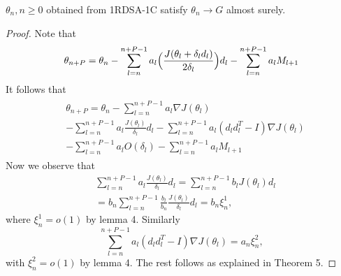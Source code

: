 \begin{theorem}
  $\theta_n, n\geq0$ obtained from 1RDSA-1C satisfy $\theta_n \rightarrow G$
 almost surely.
\end{theorem}
\begin{proof}
Note that
 \begin{align*}
 \theta_{n+P} = \theta_n-\sum_{l=n}^{n+P-1}a_l\Big{(}\frac{J(\theta_l+\delta_l d_l)}{2\delta_l}\Big{)}d_l-\sum_{l=n}^{n+P-1}a_lM_{l+1}
 \end{align*} 
It follows that
 \begin{align*}
  \begin{split}
  & \theta_{n+P} = \theta_n- \sum_{l=n}^{n+P-1}a_l\nabla J(\theta_l)\\ 
  & -\sum_{l=n}^{n+P-1}a_l\frac{J(\theta_l)}{\delta_l}d_l-\sum_{l=n}^{n+P-1}a_l(d_ld_l^T-I)\nabla J(\theta_l)\\
  & -\sum_{l=n}^{n+P-1}a_lO(\delta_l)
  -\sum_{l=n}^{n+P-1}a_lM_{l+1}
 \end{split}
 \end{align*}
 Now we observe that
 \begin{align*}
 & \sum_{l=n}^{n+P-1}a_l\frac{J(\theta_l)}{\delta_l}d_l= \sum_{l=n}^{n+P-1} b_{l}J(\theta_l)d_l\\
 & = b_n\sum_{l=n}^{n+P-1}\frac{b_l}{b_n}\frac{J(\theta_l)}{\delta_l}d_l=b_n\xi^{1}_{n},
 \end{align*}
 where $\xi^{1}_{n}=o(1)$ by lemma 4. Similarly
 $$\sum_{l=n}^{n+P-1}a_l(d_ld_l^T-I)\nabla J(\theta_l)=a_n\xi^{2}_{n},$$
 with $\xi^{2}_{n}=o(1)$ by lemma 4.
 The rest follows as explained in Theorem 5.
\end{proof}
